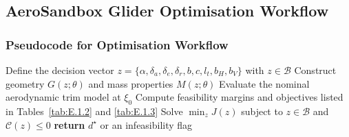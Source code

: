 \subsection{AeroSandbox Glider Optimisation Workflow}\label{sec:E.1}

\vspace{0.20cm}

\LinesNumbered
\SetAlgoLined
\DontPrintSemicolon
{}
\SetAlCapSkip{0.50em}
\SetAlgoCaptionSeparator{\quad}

\subsubsection{Pseudocode for Optimisation Workflow}\label{sec:E.1.1}

\vspace{0.30cm}

\begin{algorithm}[H]
\small
\setlength{\baselineskip}{1.15\baselineskip}
\caption{Nominal AeroSandbox~\cite{AeroSandbox} glider design optimisation}
\label{alg:E.1.1}
Define the decision vector \(z=\{\alpha,\delta_a,\delta_e,\delta_r,b,c,l_t,b_H,b_V\}\) with \(z\in\mathcal{B}\)\;
Construct geometry \(G(z;\theta)\) and mass properties \(M(z;\theta)\)\;
Evaluate the nominal aerodynamic trim model at \(\xi_0\)\;
Compute feasibility margins and objectives listed in \textcolor{ICLBlue}{Tables~\ref{tab:E.1.2}} and \ref{tab:E.1.3}\;
Solve \(\min_z J(z)\) subject to \(z\in\mathcal{B}\) and \(\mathcal{C}(z)\leq0\)\;
\textbf{return} \(d^\star\) or an infeasibility flag\;
\end{algorithm}

\vspace{0.70cm}

